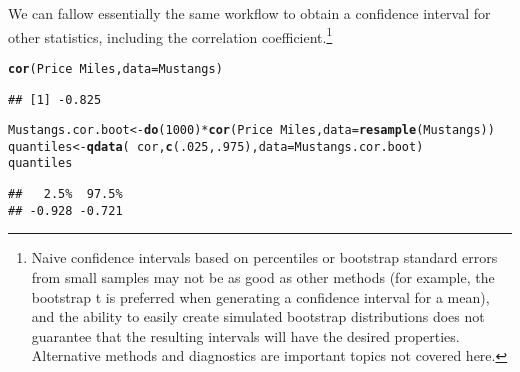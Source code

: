 \documentclass[11pt]{article}\usepackage[]{graphicx}\usepackage[]{color}
\makeatletter
\newcommand{\hlnum}[1]{\textcolor[rgb]{0.686,0.059,0.569}{#1}}%
\newcommand{\hlopt}[1]{\textcolor[rgb]{0,0,0}{#1}}%
\newcommand{\hlstd}[1]{\textcolor[rgb]{0.345,0.345,0.345}{#1}}%
\newcommand{\hlkwb}[1]{\textcolor[rgb]{0.69,0.353,0.396}{#1}}%
\newcommand{\hlkwc}[1]{\textcolor[rgb]{0.333,0.667,0.333}{#1}}%
\newcommand{\hlkwd}[1]{\textcolor[rgb]{0.737,0.353,0.396}{\textbf{#1}}}%
\newenvironment{kframe}{%
 \def\at@end@of@kframe{}%
 \ifinner\ifhmode%
  \def\at@end@of@kframe{\end{minipage}}%
  \begin{minipage}{\columnwidth}%
 \fi\fi%
 \def\FrameCommand##1{\hskip\@totalleftmargin \hskip-\fboxsep
 \colorbox{shadecolor}{##1}\hskip-\fboxsep
     \hskip-\linewidth \hskip-\@totalleftmargin \hskip\columnwidth}%
 \MakeFramed {\advance\hsize-\width
   \@totalleftmargin\z@ \linewidth\hsize
   \@setminipage}}%
 {\par\unskip\endMakeFramed%
 \at@end@of@kframe}
\newenvironment{knitrout}{}{} %
\makeatother
\begin{document}
We can fallow essentially the same workflow to obtain a confidence interval
for other statistics, including the correlation coefficient.\footnote{Naive 
confidence intervals based on percentiles or bootstrap standard errors from 
small samples may not be
as good as other methods (for example, the bootstrap t is preferred when
generating a confidence interval for a mean), and the ability to easily 
create simulated bootstrap distributions does not guarantee that the resulting
intervals will have the desired properties.  Alternative methods and diagnostics
are important topics not covered here.}
\begin{knitrout}
\color{fgcolor}\begin{kframe}
\begin{alltt}
\hlkwd{cor}\hlstd{(Price} \hlopt{~} \hlstd{Miles,} \hlkwc{data} \hlstd{= Mustangs)}
\end{alltt}
\begin{verbatim}
## [1] -0.825
\end{verbatim}
\end{kframe}
\end{knitrout}

\begin{knitrout}
\color{fgcolor}\begin{kframe}
\begin{alltt}
\hlstd{Mustangs.cor.boot} \hlkwb{<-} \hlkwd{do}\hlstd{(}\hlnum{1000}\hlstd{)} \hlopt{*} \hlkwd{cor}\hlstd{(Price} \hlopt{~} \hlstd{Miles,} \hlkwc{data} \hlstd{=} \hlkwd{resample}\hlstd{(Mustangs))}
\hlstd{quantiles} \hlkwb{<-} \hlkwd{qdata}\hlstd{(}\hlopt{~} \hlstd{cor,} \hlkwd{c}\hlstd{(}\hlnum{.025}\hlstd{,} \hlnum{.975}\hlstd{),} \hlkwc{data} \hlstd{= Mustangs.cor.boot)}
\hlstd{quantiles}
\end{alltt}
\begin{verbatim}
##   2.5%  97.5% 
## -0.928 -0.721
\end{verbatim}
\end{kframe}
\end{knitrout}
\end{document}
